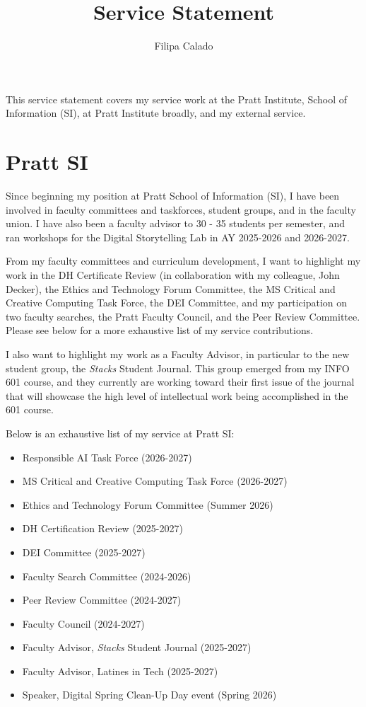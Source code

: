 \documentclass[12pt]{article}
\author{Filipa Calado}
\date{}
\title{Service Statement}
\makeatletter
\renewcommand{\maketitle}{%
\begin{center}
{\LARGE\@title\par}
\vspace{0.5em}
{\large\@author\par}
\vspace{0.5em}
{\large\@date\par}
\end{center}
}
\makeatother
\begin{document}
\maketitle
This service statement covers my service work at the Pratt Institute, School of
Information (SI), at Pratt Institute broadly, and my external service. 

\section*{Pratt SI}
\label{sec:org626d777}
Since beginning my position at Pratt School of Information (SI), I
have been involved in faculty committees and taskforces, student
groups, and in the faculty union. I have also been a faculty advisor
to 30 - 35 students per semester, and ran workshops for the Digital
Storytelling Lab in AY 2025-2026 and 2026-2027.

From my faculty committees and curriculum development, I want to
highlight my work in the DH Certificate Review (in collaboration with
my colleague, John Decker), the Ethics and Technology Forum Committee,
the MS Critical and Creative Computing Task Force, the DEI Committee,
and my participation on two faculty searches, the Pratt Faculty
Council, and the Peer Review Committee. Please see below for a more
exhaustive list of my service contributions.

I also want to highlight my work as a Faculty Advisor, in particular
to the new student group, the \emph{Stacks} Student Journal. This group
emerged from my INFO 601 course, and they currently are working toward
their first issue of the journal that will showcase the high level of
intellectual work being accomplished in the 601 course.

Below is an exhaustive list of my service at Pratt SI:
\begin{itemize}
\item Responsible AI Task Force (2026-2027)
\item MS Critical and Creative Computing Task Force (2026-2027)
\item Ethics and Technology Forum Committee (Summer 2026)
\item DH Certification Review (2025-2027)
\item DEI Committee (2025-2027)
\item Faculty Search Committee (2024-2026)
\item Peer Review Committee (2024-2027)
\item Faculty Council (2024-2027)
\item Faculty Advisor, \emph{Stacks} Student Journal (2025-2027)
\item Faculty Advisor, Latines in Tech (2025-2027)
\item Speaker, Digital Spring Clean-Up Day event (Spring 2026)
\end{itemize}
\end{document}
